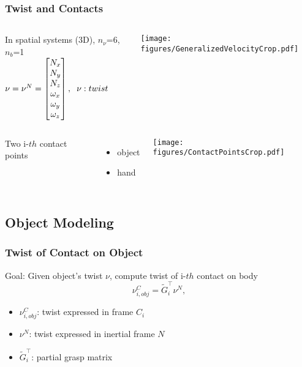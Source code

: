 \documentclass{beamer}
\begin{document}
\begin{frame}
\frametitle{Twist and Contacts}
\begin{columns}[c] %

In spatial systems (3D), $n_{\nu}$=6, $n_b$=1\\
$\nu = \nu^{N} = \begin{bmatrix}
N_x\\
N_y\\
N_z\\
\omega_x\\
\omega_y\\
\omega_z
\end{bmatrix}, \hspace{.2cm} \nu: twist $

\centering
 \texttt{[image: figures/GeneralizedVelocityCrop.pdf]}
\end{columns}

\begin{columns}[c] %

Two i-$th$ contact points
\begin{itemize}
\item object \vspace{0.2cm}
\item hand \vspace{0.2cm}
\end{itemize}

\centering
 \texttt{[image: figures/ContactPointsCrop.pdf]}
\end{columns}

\end{frame}

\subsection{Object Modeling}

\begin{frame}
\frametitle{Twist of Contact on Object}
Goal: Given object's twist $\nu$, compute twist of i-$th$ contact on body 
\begin{equation*}
\nu_{i,obj}^C=\tilde{G}^{\intercal}_i \nu^N,
\end{equation*}
\begin{itemize}
\item $\nu_{i,obj}^C$: twist expressed in frame {$C_i$} \vspace{.2cm}
\item $\nu^N$: twist expressed in inertial frame {$N$} \vspace{.2cm}
\item $\tilde{G}^{\intercal}_i$: partial grasp matrix \vspace{.2cm}
\end{itemize}
\end{frame}
\end{document}
